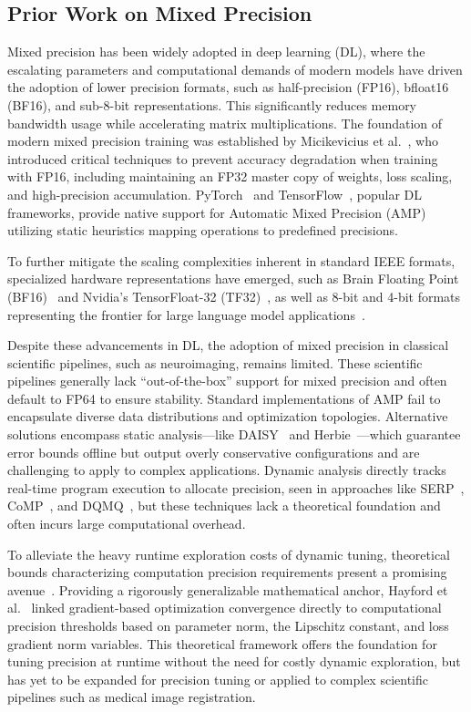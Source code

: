 \documentclass[journal,twoside,web]{ieeecolor}
\begin{document}
\subsection{Prior Work on Mixed Precision}
Mixed precision has been widely adopted in deep learning (DL), where the escalating parameters and computational demands of modern models have driven the adoption of lower precision formats, such as half-precision (FP16), bfloat16 (BF16), and sub-8-bit representations. This significantly reduces memory bandwidth usage while accelerating matrix multiplications. The foundation of modern mixed precision training was established by Micikevicius et al.~\cite{Micikevicius2017-sf}, who introduced critical techniques to prevent accuracy degradation when training with FP16, including maintaining an FP32 master copy of weights, loss scaling, and high-precision accumulation. PyTorch~\cite{Paszke2019-vk} and TensorFlow~\cite{Abadi2016-vm}, popular DL frameworks, provide native support for Automatic Mixed Precision (AMP) utilizing static heuristics mapping operations to predefined precisions.

To further mitigate the scaling complexities inherent in standard IEEE formats, specialized hardware representations have emerged, such as Brain Floating Point (BF16)~\cite{Kalamkar2019-br} and Nvidia's TensorFloat-32 (TF32)~\cite{Stosic2021-eo}, as well as 8-bit and 4-bit formats representing the frontier for large language model applications~\cite{Sevegnani2025-zd}.

Despite these advancements in DL, the adoption of mixed precision in classical scientific pipelines, such as neuroimaging, remains limited. These scientific pipelines generally lack ``out-of-the-box'' support for mixed precision and often default to FP64 to ensure stability. Standard implementations of AMP fail to encapsulate diverse data distributions and optimization topologies. Alternative solutions encompass static analysis---like DAISY~\cite{Darulova2018-wv} and Herbie~\cite{Panchekha2015-au}---which guarantee error bounds offline but output overly conservative configurations and are challenging to apply to complex applications. Dynamic analysis directly tracks real-time program execution to allocate precision, seen in approaches like SERP~\cite{Rios2021-it}, CoMP~\cite{Dai2025-ek}, and DQMQ~\cite{Wang2023-iu}, but these techniques lack a theoretical foundation and often incurs large computational overhead. 

To alleviate the heavy runtime exploration costs of dynamic tuning, theoretical bounds characterizing computation precision requirements present a promising avenue~\cite{Sakr2017-ec, Tu2023-os, Wang2024-re}. Providing a rigorously generalizable mathematical anchor, Hayford et al.~\cite{Hayford2024-kb} linked gradient-based optimization convergence directly to computational precision thresholds based on parameter norm, the Lipschitz constant, and loss gradient norm variables. This theoretical framework offers the foundation for tuning precision at runtime without the need for costly dynamic exploration, but has yet to be expanded for precision tuning or applied to complex scientific pipelines such as medical image registration.
\end{document}
